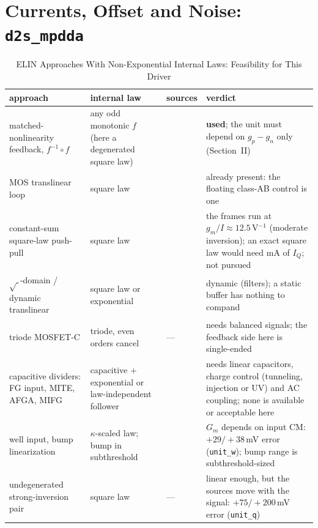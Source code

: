 \documentclass[journal]{IEEEtran}
\newcommand{\cell}[1]{\texttt{#1}}
\newcommand{\mV}{\,mV}
\begin{document}
\section{Currents, Offset and Noise: \texttt{d2s\_mpdda}}
\label{sec:sizing}

\begin{table}[!t]
\caption{ELIN Approaches With Non-Exponential Internal Laws: Feasibility for This Driver}
\label{tab:elin}
\centering\footnotesize
\begin{tabularx}{\textwidth}{@{}>{\raggedright\arraybackslash}p{}>{\raggedright\arraybackslash}p{}>{\raggedright\arraybackslash}p{}L@{}}
\toprule
approach & internal law & sources & verdict\\
\midrule
matched-nonlinearity feedback, $f^{-1}\circ f$ & any odd monotonic $f$ (here a degenerated square law) & \cite{minch97,sackinger87} & \textbf{used}; the unit must depend on $g_p-g_n$ only (Section~II)\\
MOS translinear loop & square law & \cite{wiegerink,seevinck87} & already present: the floating class-AB control \cite{hogervorst94,monticelli86} is one\\
constant-sum square-law push-pull & square law & \cite{sarpeshkar97} & the frames run at $g_m/I\approx12.5$\,V$^{-1}$ (moderate inversion); an exact square law would need mA of $I_Q$; not pursued\\
$\sqrt{\ }$-domain / dynamic translinear & square law or exponential & \cite{mulder97tcas,mulder97jssc,efthivoulidis99,hiseni09} & dynamic (filters); a static buffer has nothing to compand\\
triode MOSFET-C & triode, even orders cancel & --- & needs balanced signals; the feedback side here is single-ended\\
capacitive dividers: FG input, MITE, AFGA, MIFG & capacitive + exponential or law-independent follower & \cite{minch97,minch01,hasler97,sanchez_fg,montalvo93} & needs linear capacitors, charge control (tunneling, injection or UV) and AC coupling; none is available or acceptable here\\
well input, bump linearization & $\kappa$-scaled law; bump in subthreshold & \cite{sarpeshkar97} & $G_m$ depends on input CM: $+29/+38$\mV{} error (\cell{unit\_w}); bump range is subthreshold-sized\\
undegenerated strong-inversion pair & square law & --- & linear enough, but the sources move with the signal: $+75/+200$\mV{} error (\cell{unit\_q})\\
\bottomrule
\end{tabularx}
\end{table}
\end{document}
